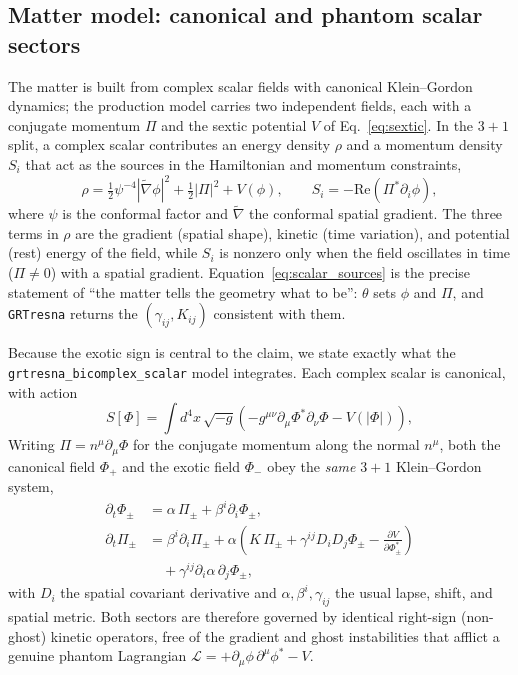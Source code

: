 \documentclass[twocolumn,floatfix,aps,prd,nofootinbib]{revtex4-2}
\begin{document}
\subsection{Matter model: canonical and phantom scalar sectors}
\label{sec:phantom_action}

The matter is built from complex scalar fields with canonical Klein--Gordon
dynamics; the production model carries two independent fields, each with a
conjugate momentum $\Pi$ and the sextic potential $V$ of
Eq.~\eqref{eq:sextic}. In the $3{+}1$ split, a complex scalar contributes an
energy density $\rho$ and a momentum density $S_i$ that act as the sources in
the Hamiltonian and momentum constraints,
\begin{equation}
\rho=\tfrac12\psi^{-4}|\tilde\nabla\phi|^2+\tfrac12|\Pi|^2+V(\phi),
\qquad
S_i=-\mathrm{Re}\!\left(\Pi^{*}\partial_i\phi\right),
\label{eq:scalar_sources}
\end{equation}
where $\psi$ is the conformal factor and $\tilde\nabla$ the conformal spatial
gradient. The three terms in $\rho$ are the gradient (spatial shape), kinetic
(time variation), and potential (rest) energy of the field, while $S_i$ is
nonzero only when the field oscillates in time ($\Pi\neq0$) with a spatial
gradient. Equation~\eqref{eq:scalar_sources} is the precise statement of ``the
matter tells the geometry what to be'': $\theta$ sets $\phi$ and $\Pi$, and
\texttt{GRTresna} returns the $(\gamma_{ij},K_{ij})$ consistent with them.

Because the exotic sign is central to the claim, we state exactly what the
\texttt{grtresna\_bicomplex\_scalar} model integrates. Each complex scalar is
canonical, with action
\begin{equation}
S[\Phi]=\int d^4x\,\sqrt{-g}\left(
-g^{\mu\nu}\partial_\mu\Phi^{*}\partial_\nu\Phi-V(|\Phi|)\right),
\label{eq:canonical_action}
\end{equation}
Writing $\Pi=n^\mu\partial_\mu\Phi$ for the conjugate momentum along the
normal $n^\mu$, both the canonical field $\Phi_{+}$ and the exotic field
$\Phi_{-}$ obey the \emph{same} $3{+}1$ Klein--Gordon system,
\begin{align}
\partial_t\Phi_{\pm} &= \alpha\,\Pi_{\pm}+\beta^i\partial_i\Phi_{\pm},
\nonumber\\
\partial_t\Pi_{\pm} &= \beta^i\partial_i\Pi_{\pm}
   +\alpha\!\left(K\,\Pi_{\pm}+\gamma^{ij}D_iD_j\Phi_{\pm}
   -\frac{\partial V}{\partial\Phi_{\pm}^{*}}\right)\nonumber\\
&\quad +\gamma^{ij}\partial_i\alpha\,\partial_j\Phi_{\pm},
\label{eq:kg_evolution}
\end{align}
with $D_i$ the spatial covariant derivative and $\alpha,\beta^i,\gamma_{ij}$
the usual lapse, shift, and spatial metric. Both sectors are therefore governed
by identical right-sign (non-ghost) kinetic operators, free of the gradient and
ghost instabilities that afflict a genuine phantom Lagrangian
$\mathcal L=+\partial_\mu\phi\,\partial^\mu\phi^{*}-V$.
\end{document}
